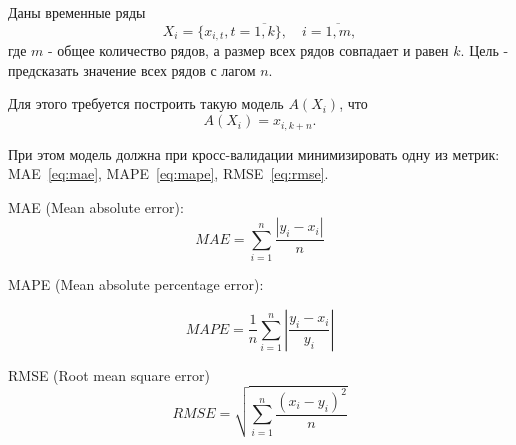 \documentclass[a4paper,article,14pt]{extarticle}
\begin{document}
\pagebreak
{}

Даны временные ряды
\begin{equation}
    {X_{i} = \{x_{i,t}, t=\overline{1,k}\},\quad i=\overline{1,m}},
    \label{eq:equation}
\end{equation}
где $m$ - общее количество рядов, а размер всех рядов совпадает и равен $k$.
Цель - предсказать значение всех рядов с лагом $n$.

Для этого требуется построить такую модель $A(X_i)$, что
\begin{equation}
    A(X_i)=x_{i, k+n}.
    \label{eq:equation2}
\end{equation}

При этом модель должна при кросс-валидации минимизировать одну из метрик: MAE~\eqref{eq:mae}, MAPE~\eqref{eq:mape}, RMSE~\eqref{eq:rmse}.

MAE (Mean absolute error):
\begin{equation}
    MAE = \sum_{i=1}^{n} \frac{|y_i - x_i|}{n}
    \label{eq:mae}
\end{equation}

MAPE (Mean absolute percentage error):

\begin{equation}
    MAPE = \frac{1}{n} \sum_{i=1}^{n} \left| \frac{y_i - x_i}{y_i} \right|
    \label{eq:mape}
\end{equation}

RMSE (Root mean square error)
\begin{equation}
    RMSE = \sqrt{\sum_{i=1}^{n} \frac{(x_i - y_i) ^ 2}{n}}
    \label{eq:rmse}
\end{equation}

\pagebreak
{}
\end{document}
